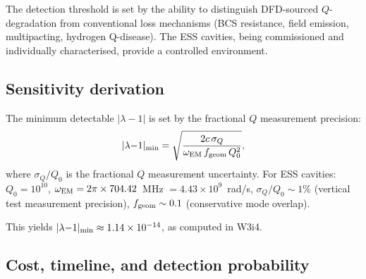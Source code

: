 \documentclass[11pt]{article}
\newcommand{\ee}[1]{\times 10^{#1}}
\newcommand{\lamdiff}{|\lambda{-}1|}
\begin{document}
The detection threshold is set by the ability to distinguish DFD-sourced
$Q$-degradation from conventional loss mechanisms (BCS resistance,
field emission, multipacting, hydrogen Q-disease). The ESS cavities,
being commissioned and individually characterised, provide a controlled
environment.

\subsection{Sensitivity derivation}

The minimum detectable $\lamdiff$ is set by the fractional $Q$
measurement precision:
\begin{equation}
\lamdiff_{\rm min} = \sqrt{\frac{2c\,\sigma_Q}{\omega_{\rm EM}\,f_{\rm geom}\,Q_0^2}},
\label{eq:lam-min-Q}
\end{equation}
where $\sigma_Q/Q_0$ is the fractional $Q$ measurement uncertainty.
For ESS cavities: $Q_0 = 10^{10}$, $\omega_{\rm EM} = 2\pi\times 704.42$~MHz
$= 4.43\ee{9}$~rad/s, $\sigma_Q/Q_0 \sim 1\%$ (vertical test measurement
precision), $f_{\rm geom} \sim 0.1$ (conservative mode overlap).

This yields $\lamdiff_{\rm min} \approx 1.14\ee{-14}$, as computed in W3i4.

\subsection{Cost, timeline, and detection probability}
\end{document}
